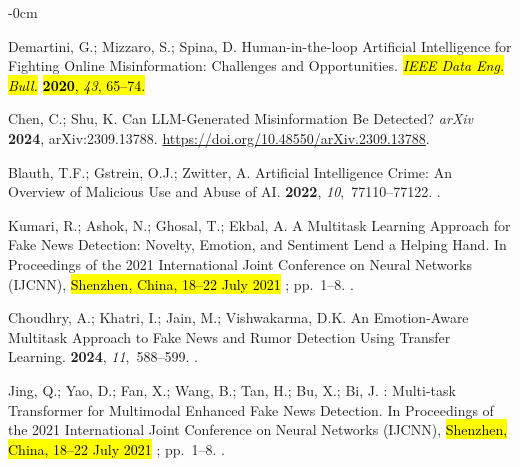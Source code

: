 \documentclass[electronics,article,accept,pdftex,moreauthors,electronics]{Definitions/mdpi}
\begin{document}
\begin{adjustwidth}{-\extralength}{0cm}
\begin{thebibliography}{999}
Demartini, G.; Mizzaro, S.; Spina, D.
\newblock Human-in-the-loop {Artiﬁcial} {Intelligence} for {Fighting}
  {Online} {Misinformation}: {Challenges} and {Opportunities}.
\emph{\hl{IEEE Data Eng. Bull.}} \hl{\textbf{2020}, \emph{43}, 65--74.}

Chen, C.; Shu, K.
\newblock Can {LLM}-{Generated} {Misinformation} {Be} {Detected}? \emph{arXiv} \textbf{2024}, arXiv:2309.13788. {\url{https://doi.org/10.48550/arXiv.2309.13788}}.

Blauth, T.F.; Gstrein, O.J.; Zwitter, A.
\newblock Artificial {Intelligence} {Crime}: {An} {Overview} of {Malicious}
  {Use} and {Abuse} of {AI}.
 {\bf 2022}, {\em 10},~77110--77122.
.

Kumari, R.; Ashok, N.; Ghosal, T.; Ekbal, A.
\newblock A {Multitask} {Learning} {Approach} for {Fake} {News} {Detection}:
  {Novelty}, {Emotion}, and {Sentiment} {Lend} a {Helping} {Hand}.
\newblock In Proceedings of the 2021 International Joint Conference on Neural Networks (IJCNN), \hl{Shenzhen, China, 18--22 July 2021}%
; pp.~1--8.
.

Choudhry, A.; Khatri, I.; Jain, M.; Vishwakarma, D.K.
\newblock An {Emotion}-{Aware} {Multitask} {Approach} to {Fake} {News} and
  {Rumor} {Detection} {Using} {Transfer} {Learning}.
 {\bf 2024}, {\em 11},~588--599.
.

Jing, Q.; Yao, D.; Fan, X.; Wang, B.; Tan, H.; Bu, X.; Bi, J.
: {Multi}-task {Transformer} for {Multimodal} {Enhanced}
  {Fake} {News} {Detection}.
\newblock In Proceedings of the 2021 International Joint Conference on Neural Networks (IJCNN), \hl{Shenzhen, China, 18--22 July 2021}%
; pp.~1--8.
.


\end{thebibliography}
\end{adjustwidth}
\end{document}
